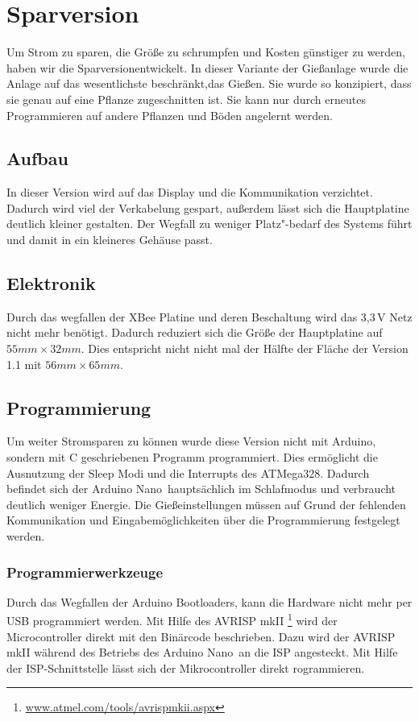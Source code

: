 
\section{Sparversion}
	Um Strom zu sparen, die Größe zu schrumpfen und Kosten günstiger zu werden, haben wir die \glqq Sparversion\grqq entwickelt.
	In dieser Variante der Gießanlage wurde die Anlage auf das wesentlichste beschränkt,das Gießen.
	Sie wurde so konzipiert, dass sie genau auf eine Pflanze zugeschnitten ist.
	Sie kann nur durch erneutes Programmieren auf andere Pflanzen und Böden angelernt werden. 	
	\subsection{Aufbau}
	In dieser Version wird auf das Display und die Kommunikation verzichtet.
	Dadurch wird viel der Verkabelung gespart, außerdem lässt sich die Hauptplatine deutlich kleiner gestalten.
	Der Wegfall zu weniger Platz"-bedarf des Systems führt und damit in ein kleineres Gehäuse passt.
	\subsection{Elektronik}
	Durch das wegfallen der XBee Platine und deren Beschaltung wird das 3,3\,V Netz nicht mehr benötigt.
	Dadurch reduziert sich die Größe der Hauptplatine auf \begin{math} 55 mm \times 32 mm \end{math}.
	Dies entspricht nicht nicht mal der Hälfte der Fläche der Version 1.1 mit \begin{math} 56 mm \times 65 mm \end{math}.
	\subsection{Programmierung}
	Um weiter Stromsparen zu können wurde diese Version nicht mit Arduino, sondern mit C geschriebenen Programm programmiert.
	Dies ermöglicht die Ausnutzung der Sleep Modi und die Interrupts des ATMega328. 
	Dadurch befindet sich der \glqq Arduino Nano\grqq \ hauptsächlich im Schlafmodus und verbraucht deutlich weniger Energie.
	Die Gießeinstellungen müssen auf Grund der fehlenden Kommunikation und Eingabemöglichkeiten über die Programmierung festgelegt werden.
	\subsubsection{Programmierwerkzeuge}
	Durch das Wegfallen der Arduino Bootloaders, kann die Hardware nicht mehr per USB programmiert werden. 
	Mit Hilfe des AVRISP mkII \footnote{\href{http://www.atmel.com/tools/avrispmkii.aspx}{www.atmel.com/tools/avrispmkii.aspx}} wird der Microcontroller direkt mit den Binärcode beschrieben. 
	Dazu wird der AVRISP mkII während des Betriebs des \glqq Arduino Nano\grqq\ an die ISP angesteckt. 
	Mit Hilfe der ISP-Schnittstelle lässt sich der Mikrocontroller direkt rogrammieren.
